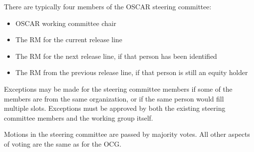 There are typically four members of the OSCAR steering committee:

\begin{itemize}
\item OSCAR working committee chair
\item The RM for the current release line
\item The RM for the next release line, if that person has been
  identified
\item The RM from the previous release line, if that person is still
  an equity holder
\end{itemize}

Exceptions may be made for the steering committee members if some of
the members are from the same organization, or if the same person
would fill multiple slots.  Exceptions must be approved by both the
existing steering committee members and the working group itself.

Motions in the steering committee are passed by majority votes.  All
other aspects of voting are the same as for the OCG.
